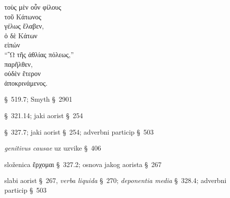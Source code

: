 
{\large
\begin{greek}
\noindent τοὺς μὲν οὖν φίλους \\
\tabto{2em} τοῦ Κάτωνος \\
γέλως ἔλαβεν, \\
ὁ δὲ Κάτων \\
\tabto{2em} εἰπών \\
\tabto{4em} ``῍Ω τῆς ἀθλίας πόλεως,''\\
παρῆλθεν, \\
οὐδὲν ἕτερον \\
\tabto{2em} ἀποκρινάμενος. \\

\end{greek}
}

\begin{description}[noitemsep]
\item[μὲν οὖν] §~519.7; Smyth §~2901
\item[ἔλαβεν] §~321.14; jaki aorist §~254
\item[εἰπών] §~327.7; jaki aorist §~254; adverbni particip §~503
\item[τῆς ἀθλίας πόλεως] \textit{genitivus causae} uz uzvike §~406
\item[παρῆλθεν] složenica ἔρχομαι §~327.2; osnova jakog aorista §~267
\item[ἀποκρινάμενος] slabi aorist §~267, \textit{verba liquida} §~270; \textit{deponentia media} §~328.4; adverbni particip §~503

\end{description}


